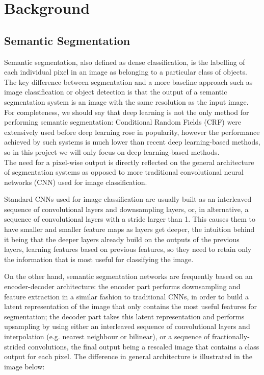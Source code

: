 \documentclass[12pt,twoside]{report}
\begin{document}
\chapter{Background}

\section{Semantic Segmentation}

Semantic segmentation, also defined as dense classification, is the labelling of each individual pixel in an image as belonging to a particular class of objects. The key difference between segmentation and a more baseline approach such as image classification or object detection is that the output of a semantic segmentation system is an image with the same resolution as the input image. For completeness, we should say that deep learning is not the only method for performing semantic segmentation: Conditional Random Fields (CRF) were extensively used before deep learning rose in popularity, however the performance achieved by such systems is much lower than recent deep learning-based methods, so in this project we will only focus on deep learning-based methods. 
\\

The need for a pixel-wise output is directly reflected on the general architecture of segmentation systems as opposed to more traditional convolutional neural networks (CNN) used for image classification.

Standard CNNs used for image classification are usually built as an interleaved sequence of convolutional layers and downsampling layers, or, in alternative, a sequence of convolutional layers with a stride larger than 1. This causes them to have smaller and smaller feature maps as layers get deeper, the intuition behind it being that the deeper layers already build on the outputs of the previous layers, learning features based on previous features, so they need to retain only the information that is most useful for classifying the image.

On the other hand, semantic segmentation networks are frequently based on an encoder-decoder architecture: the encoder part performs downsampling and feature extraction in a similar fashion to traditional CNNs, in order to build a latent representation of the image that only contains the most useful features for segmentation; the decoder part takes this latent representation and performs upsampling by using either an interleaved sequence of convolutional layers and interpolation (e.g. nearest neighbour or bilinear), or a sequence of fractionally-strided convolutions, the final output being a rescaled image that contains a class output for each pixel. The difference in general architecture is illustrated in the image below: 
\\
\end{document}
